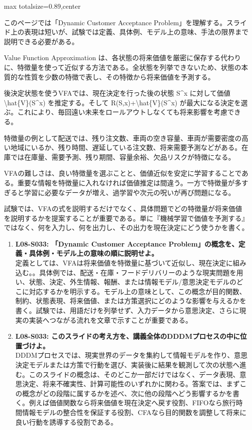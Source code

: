 \begin{minipage}[t]{0.58\textwidth}
\begin{adjustbox}{max totalsize={\textwidth}{0.89\textheight},center}
\begin{minipage}{\textwidth}\scriptsize
{}このページでは「Dynamic Customer Acceptance Problem」を理解する。スライド上の表現は短いが、試験では定義、具体例、モデル上の意味、手法の限界まで説明できる必要がある。\par
Value Function Approximation は、各状態の将来価値を厳密に保存する代わりに、特徴量を使って近似する方法である。全状態を列挙できないため、状態の本質的な性質を少数の特徴で表し、その特徴から将来価値を予測する。\par
後決定状態を使うVFAでは、現在決定を行った後の状態 S\textasciicircum{}x に対して価値 \textbackslash{}hat\{V\}(S\textasciicircum{}x) を推定する。そして R(S,x)+\textbackslash{}hat\{V\}(S\textasciicircum{}x) が最大になる決定を選ぶ。これにより、毎回遠い未来をロールアウトしなくても将来影響を考慮できる。\par
特徴量の例として配送では、残り注文数、車両の空き容量、車両が需要密度の高い地域にいるか、残り時間、遅延している注文数、将来需要予測などがある。在庫では在庫量、需要予測、残り期間、容量余裕、欠品リスクが特徴になる。\par
VFAの難しさは、良い特徴量を選ぶことと、価値近似を安定に学習することである。重要な情報を特徴量に入れなければ価値推定は間違う。一方で特徴量が多すぎると学習に必要なデータが増え、過学習や次元の呪いが再び問題になる。\par
試験では、VFAの式を説明するだけでなく、具体問題でどの特徴量が将来価値を説明するかを提案することが重要である。単に『機械学習で価値を予測する』ではなく、何を入力し、何を出力し、その出力を現在決定にどう使うかを書く。\par{}\begin{enumerate}\item \textbf{L08-S033: 「Dynamic Customer Acceptance Problem」の概念を、定義・具体例・モデル上の意味の順に説明せよ。}\\定義としては、VFAは将来価値を特徴量に基づいて近似し、現在決定に組み込む。。具体例では、配送・在庫・フードデリバリーのような現実問題を用い、状態、決定、外生情報、報酬、または情報モデル/意思決定モデルのどこに対応するかを明示する。モデル上の意味として、この概念が目的関数、制約、状態表現、将来価値、または方策選択にどのような影響を与えるかを書く。試験では、用語だけを列挙せず、入力データから意思決定、さらに現実の実装へつながる流れを文章で示すことが重要である。\item \textbf{L08-S033: このスライドの考え方を、講義全体のDDDMプロセスの中に位置づけよ。}\\DDDMプロセスでは、現実世界のデータを集約して情報モデルを作り、意思決定モデルまたは方策で行動を選び、実装後に結果を観測して次の状態へ進む。このスライドの概念は、そのどこか一部だけではなく、データ表現、意思決定、将来不確実性、計算可能性のいずれかに関わる。答案では、まずこの概念がどの段階に属するかを述べ、次に他の段階へどう影響するかを書く。例えば価値関数なら将来価値を現在決定へ戻す役割、FIFOなら旅行時間情報モデルの整合性を保証する役割、CFAなら目的関数を調整して将来に良い行動を誘導する役割である。\end{enumerate}

\end{minipage}
\end{adjustbox}
\end{minipage}
